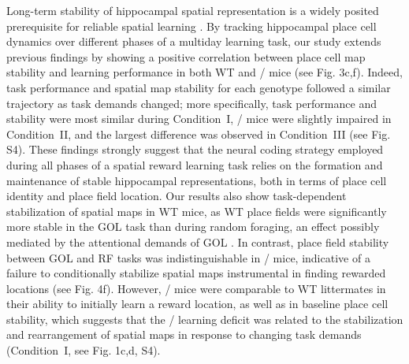 Long-term stability of hippocampal spatial representation is a widely posited prerequisite for reliable spatial learning \citep{Kentros2004}\citep{Lever2002b}\citep{Mankin2012}\citep{Thompson1990}\citep{Ziv2013}. By tracking hippocampal place cell dynamics over different phases of a multiday learning task, our study extends previous findings by showing a positive correlation between place cell map stability and learning performance in both WT and \df/ mice (see Fig. 3c,f). Indeed, task performance and spatial map stability for each genotype followed a similar trajectory as task demands changed; more specifically, task performance and stability were most similar during Condition~I, \df/ mice were slightly impaired in Condition~II, and the largest difference was observed in Condition~III (see Fig. S4). These findings strongly suggest that the neural coding strategy employed during all phases of a spatial reward learning task relies on the formation and maintenance of stable hippocampal representations, both in terms of place cell identity and place field location. Our results also show task-dependent stabilization of spatial maps in WT mice, as WT place fields were significantly more stable in the GOL task than during random foraging, an effect possibly mediated by the attentional demands of GOL \citep{Kentros2004}\citep{Kobayashi1997}\citep{Markus1995}\citep{Monaco2014}. In contrast, place field stability between GOL and RF tasks was indistinguishable in \df/ mice, indicative of a failure to conditionally stabilize spatial maps instrumental in finding rewarded locations (see Fig. 4f). However, \df/ mice were comparable to WT littermates in their ability to initially learn a reward location, as well as in baseline place cell stability, which suggests that the \df/ learning deficit was related to the stabilization and rearrangement of spatial maps in response to changing task demands (Condition~I, see Fig. 1c,d, S4).

